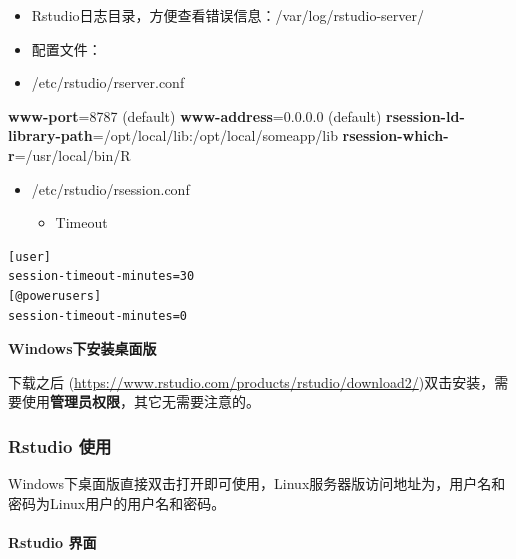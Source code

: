 \documentclass[]{article}
\newenvironment{Shaded}{\begin{snugshade}}{\end{snugshade}}
\newcommand{\KeywordTok}[1]{\textcolor[rgb]{0.13,0.29,0.53}{\textbf{{#1}}}}
\newcommand{\NormalTok}[1]{{#1}}
\providecommand{\tightlist}{%
  \setlength{\itemsep}{0pt}\setlength{\parskip}{0pt}}
\numberwithin{figure}{section}
\numberwithin{table}{section}
\theoremstyle{definition}
\theoremstyle{definition}
\theoremstyle{definition}
\theoremstyle{remark}
\begin{document}
\begin{itemize}
\tightlist
\item
  Rstudio日志目录，方便查看错误信息：/var/log/rstudio-server/
\item
  配置文件：
\item
  /etc/rstudio/rserver.conf
\end{itemize}

\begin{Shaded}
\begin{Highlighting}[]
\KeywordTok{www-port}\NormalTok{=8787 (default)}
\KeywordTok{www-address}\NormalTok{=0.0.0.0 (default)}
\KeywordTok{rsession-ld-library-path}\NormalTok{=/opt/local/lib:/opt/local/someapp/lib}
\KeywordTok{rsession-which-r}\NormalTok{=/usr/local/bin/R}
\end{Highlighting}
\end{Shaded}

\begin{itemize}
\tightlist
\item
  /etc/rstudio/rsession.conf

  \begin{itemize}
  \tightlist
  \item
    Timeout
  \end{itemize}
\end{itemize}

\begin{verbatim}
[user]
session-timeout-minutes=30
[@powerusers]
session-timeout-minutes=0
\end{verbatim}

\textbf{Windows下安装桌面版}

下载之后
(\url{https://www.rstudio.com/products/rstudio/download2/})双击安装，需要使用\textbf{管理员权限}，其它无需要注意的。

\subsubsection{Rstudio 使用}\label{rstudio-}

Windows下桌面版直接双击打开即可使用，Linux服务器版访问地址为，用户名和密码为Linux用户的用户名和密码。

\paragraph{Rstudio 界面}\label{rstudio-}
\end{document}

